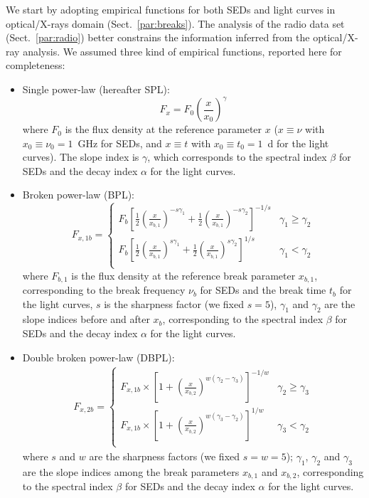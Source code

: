 \documentclass{aa}
\begin{document}
We start by adopting empirical functions for both SEDs and light curves in optical/X-rays domain (Sect.~\ref{par:breaks}).
The analysis of the radio data set (Sect.~\ref{par:radio}) better constrains the information inferred from the optical/X-ray analysis.
We assumed three kind of empirical functions, reported here for completeness:
%
\begin{itemize}
\item Single power-law (hereafter SPL):
%
\begin{equation}
F_{x} = F_0 \left(\frac{x}{x_0}\right)^{\gamma}
\label{eq:pl0}
\end{equation}
%
where $F_0$ is the flux density at the reference parameter $x$ ($x \equiv \nu$ with $x_0 \equiv \nu_0 = 1$~GHz for SEDs, and $x \equiv t$ with $x_0 \equiv t_0 = 1$~d for the light curves).
The slope index is $\gamma$, which corresponds to the spectral index $\beta$ for SEDs and the decay index $\alpha$ for the light curves.
%
\item Broken power-law (BPL):
%
\begin{equation}
F_{x,1b} = \begin{cases}
    F_b \left[\frac{1}{2} \left(\frac{x}{x_{b,1}}\right)^{-s\gamma_1} + \frac{1}{2} \left(\frac{x}{x_{b,1}}\right)^{-s\gamma_2}\right]^{-1/s} & \gamma_1 \geq \gamma_2 \\
    F_b \left[\frac{1}{2} \left(\frac{x}{x_{b,1}}\right)^{s\gamma_1} + \frac{1}{2} \left(\frac{x}{x_{b,1}}\right)^{s\gamma_2}\right]^{1/s} & \gamma_1 < \gamma_2 \\
    \end{cases}
\label{eq:pl1}
\end{equation}
%
where $F_{b,1}$ is the flux density at the reference break parameter $x_{b,1}$, corresponding to the break frequency $\nu_b$ for SEDs and the break time $t_b$ for the light curves, $s$ is the sharpness factor (we fixed $s = 5$), $\gamma_1$ and $\gamma_2$ are the slope indices before and after $x_b$, corresponding to the spectral index $\beta$ for SEDs and the decay index $\alpha$ for the light curves.
%
\item Double broken power-law (DBPL):
%
\begin{equation}
\begin{split}
F_{x,2b} = \begin{cases}
    F_{x,1b} \times \left[1 + \left(\frac{x}{x_{b,2}}\right)^{w(\gamma_2 - \gamma_3)}\right]^{-1/w} & \gamma_2 \geq \gamma_3 \\
    F_{x,1b} \times \left[1 + \left(\frac{x}{x_{b,2}}\right)^{w(\gamma_3 - \gamma_2)}\right]^{1/w} & \gamma_3 < \gamma_2 \\
    \end{cases}
\label{eq:pl2}
\end{split}
\end{equation}
%
where $s$ and $w$ are the sharpness factors (we fixed $s = w = 5$); $\gamma_1$, $\gamma_2$ and $\gamma_3$ are the slope indices among the break parameters $x_{b,1}$ and $x_{b,2}$, corresponding to the spectral index $\beta$ for SEDs and the decay index $\alpha$ for the light curves.
\end{itemize}
\end{document}
